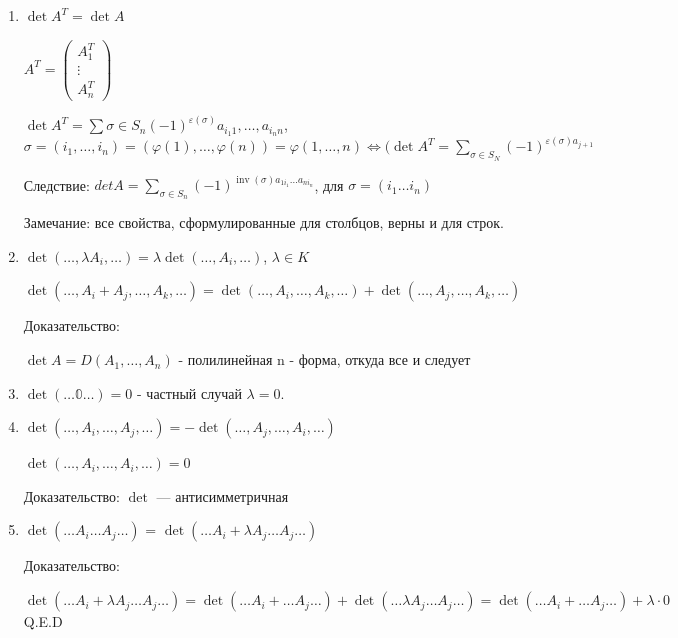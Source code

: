 \documentclass[twoside]{book}
\DeclareMathOperator{\inv}{inv}
\begin{document}
\begin{enumerate}
    \item \(\det A^T = \det A\)

          \(A^T = \begin{pmatrix}
              A_1^T  \\
              \vdots \\
              A_n^T
          \end{pmatrix}\)

          \(\det A^T = \sum\limits{\sigma \in S_n} (-1) ^{\varepsilon(\sigma)} a_{i_1 1}, \ldots, a_{i_n n}\), \(\sigma = (i_1, \ldots, i_n) = (\varphi(1), \ldots, \varphi(n)) = \varphi(1, \ldots, n) \Leftrightarrow (\det A^T = \sum\limits_{\sigma \in S_N} (-1) ^{\varepsilon(\sigma) a_{j+1}}\)

          Следствие: \(det A = \sum\limits_{\sigma \in S_n}(-1)^{\inv (\sigma)a_{1i_1}\ldots a_{ni_n}}\), для \(\sigma = (i_1\ldots i_n)\)

          Замечание: все свойства, сформулированные для столбцов, верны и для строк.

    \item \(\det(\ldots, \lambda A_i, \ldots) = \lambda \det(\ldots, A_i, \ldots)\), \(\lambda \in K\)

          \(\det(\ldots, A_i + A_j, \ldots, A_k, \ldots) = \det(\ldots, A_i, \ldots, A_k, \ldots) + \det(\ldots, A_j, \ldots, A_k, \ldots)\)

          Доказательство:

          \(\det A  = D(A_1,\ldots, A_n) \) - полилинейная n - форма, откуда все и следует

    \item \(\det ( \ldots\mathbb{0}\ldots) = 0 \) - частный случай $\lambda =0$.

    \item \(\det(\ldots, A_i, \ldots, A_j, \ldots) = -\det(\ldots, A_j, \ldots, A_i, \ldots)\)

          \(\det(\ldots, A_i, \ldots, A_i, \ldots) = 0\)

          Доказательство:
          \(\det\) --- антисимметричная

    \item \(\det (\ldots A_i\ldots A_j\ldots)\) = \(\det (\ldots A_i + \lambda A_j\ldots A_j\ldots)\)

          Доказательство:

          \(\det (\ldots A_i + \lambda A_j\ldots A_j\ldots) = \det (\ldots A_i + \ldots A_j\ldots)  + \det (\ldots \lambda A_j\ldots A_j\ldots) = \det (\ldots A_i + \ldots A_j\ldots) + \lambda\cdot 0\) Q.E.D



\end{enumerate}
\end{document}
